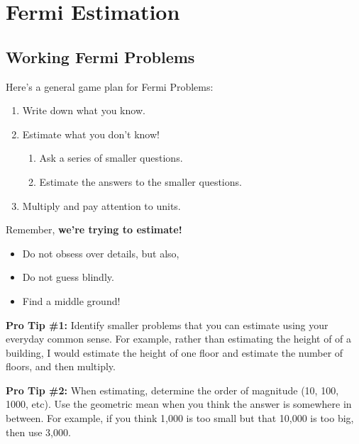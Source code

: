 \documentclass[
]{book}
\providecommand{\tightlist}{%
  \setlength{\itemsep}{0pt}\setlength{\parskip}{0pt}}
\begin{document}
\hypertarget{fermi-estimation}{%
\chapter{Fermi Estimation}\label{fermi-estimation}}

\hypertarget{working-fermi-problems}{%
\section{Working Fermi Problems}\label{working-fermi-problems}}

Here's a general game plan for Fermi Problems:

\begin{enumerate}
\def\labelenumi{\arabic{enumi}.}
\tightlist
\item
  Write down what you know.
\item
  Estimate what you don't know!

  \begin{enumerate}
  \def\labelenumii{\alph{enumii}.}
  \tightlist
  \item
    Ask a series of smaller questions.
  \item
    Estimate the answers to the smaller questions.
  \end{enumerate}
\item
  Multiply and pay attention to units.
\end{enumerate}

\bigskip

Remember, \textbf{we're trying to estimate!}

\begin{itemize}
\tightlist
\item
  Do not obsess over details, but also,
\item
  Do not guess blindly.
\item
  Find a middle ground!
\end{itemize}

\textbf{Pro Tip \#1:} Identify smaller problems that you can estimate using your everyday common sense. For example, rather than estimating the height of of a building, I would estimate the height of one floor and estimate the number of floors, and then multiply.

\textbf{Pro Tip \#2:} When estimating, determine the order of magnitude (10, 100, 1000, etc). Use the geometric mean when you think the answer is somewhere in between. For example, if you think 1,000 is too small but that 10,000 is too big, then use 3,000.
\end{document}
